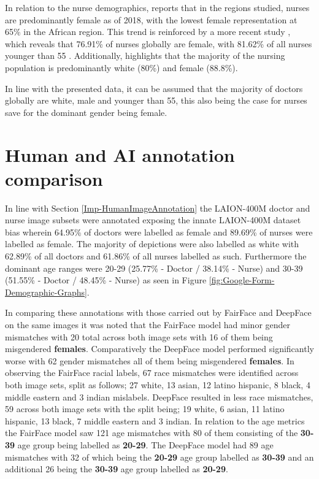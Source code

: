 In relation to the nurse demographics, \cite{statista_nurses_distribution_2023} reports that in the regions studied, nurses are predominantly female as of 2018, with the lowest female representation at 65\% in the African region. This trend is reinforced by a more recent study \cite{kharazmi_distribution_2023}, which reveals that 76.91\% of nurses globally are female, with 81.62\% of all nurses younger than 55 %
. Additionally, \cite{rosseter_nursing_2023} highlights that the majority of the nursing population is predominantly white (80\%) and female (88.8\%).

In line with the presented data, it can be assumed that the majority of doctors globally are white, male and younger than 55, this also being the case for nurses save for the dominant gender being female.

\section{Human and AI annotation comparison}\label{Eval-AnnotationBias}
In line with Section \ref{Imp-HumanImageAnnotation} the LAION-400M doctor and nurse image subsets were annotated exposing the innate LAION-400M dataset bias wherein 64.95\% of doctors were labelled as female and 89.69\% of nurses were labelled as female. The majority of depictions were also labelled as white with 62.89\% of all doctors and 61.86\% of all nurses labelled as such. Furthermore the dominant age ranges were 20-29 (25.77\% - Doctor / 38.14\% - Nurse) and 30-39 (51.55\% - Doctor / 48.45\% - Nurse) as seen in Figure \ref{fig:Google-Form-Demographic-Graphs}. 

In comparing these annotations with those carried out by FairFace and DeepFace on the same images it was noted that the FairFace model had minor gender mismatches with 20 total across both image sets with 16 of them being misgendered \textbf{females}. Comparatively the DeepFace model performed significantly worse with 62 gender mismatches all of them being misgendered \textbf{females}. In observing the FairFace racial labels, 67 race mismatches were identified across both image sets, split as follows; 27 white, 13 asian, 12 latino hispanic, 8 black, 4 middle eastern and 3 indian mislabels. DeepFace resulted in less race mismatches, 59 across both image sets with the split being; 19 white, 6 asian, 11 latino hispanic, 13 black, 7 middle eastern and 3 indian. In relation to the age metrics the FairFace model saw 121 age mismatches with 80 of them consisting of the \textbf{30-39} age group being labelled as \textbf{20-29}. The DeepFace model had 89 age mismatches with 32 of which being the \textbf{20-29} age group labelled as \textbf{30-39} and an additional 26 being the \textbf{30-39} age group labelled as \textbf{20-29}.

